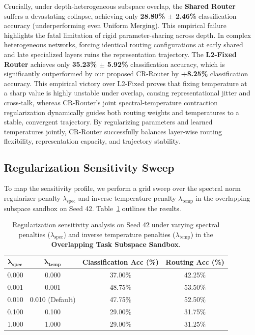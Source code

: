 Crucially, under depth-heterogeneous subspace overlap, the \textbf{Shared Router} suffers a devastating collapse, achieving only \textbf{28.80\% $\pm$ 2.46\%} classification accuracy (underperforming even Uniform Merging). This empirical failure highlights the fatal limitation of rigid parameter-sharing across depth. In complex heterogeneous networks, forcing identical routing configurations at early shared and late specialized layers ruins the representation trajectory. The \textbf{L2-Fixed Router} achieves only \textbf{35.23\% $\pm$ 5.92\%} classification accuracy, which is significantly outperformed by our proposed CR-Router by \textbf{+8.25\%} classification accuracy. This empirical victory over L2-Fixed proves that fixing temperature at a sharp value is highly unstable under overlap, causing representational jitter and cross-talk, whereas CR-Router's joint spectral-temperature contraction regularization dynamically guides both routing weights and temperatures to a stable, convergent trajectory. By regularizing parameters and learned temperatures jointly, CR-Router successfully balances layer-wise routing flexibility, representation capacity, and trajectory stability.

\subsection{Regularization Sensitivity Sweep}
To map the sensitivity profile, we perform a grid sweep over the spectral norm regularizer penalty $\lambda_{\text{spec}}$ and inverse temperature penalty $\lambda_{\text{temp}}$ in the overlapping subspace sandbox on Seed 42. Table~\ref{tab:sensitivity_overlapping} outlines the results.

\begin{table}[t]
\centering
\caption{Regularization sensitivity analysis on Seed 42 under varying spectral penalties ($\lambda_{\text{spec}}$) and inverse temperature penalties ($\lambda_{\text{temp}}$) in the \textbf{Overlapping Task Subspace Sandbox}.}
\vskip 0.15in
\label{tab:sensitivity_overlapping}
\begin{tabular}{cccc}
\toprule
$\boldsymbol{\lambda_{\text{spec}}}$ & $\boldsymbol{\lambda_{\text{temp}}}$ & \textbf{Classification Acc (\%)} & \textbf{Routing Acc (\%)} \\
\midrule
0.000 & 0.000 & 37.00\% & 42.25\% \\
0.001 & 0.001 & 48.75\% & 53.50\% \\
0.010 & 0.010 (Default) & 47.75\% & 52.50\% \\
0.100 & 0.100 & 29.00\% & 31.75\% \\
1.000 & 1.000 & 29.00\% & 31.25\% \\
\bottomrule
\end{tabular}
\end{table}

